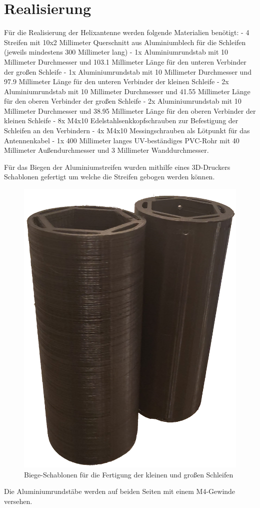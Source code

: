 \section{Realisierung}
Für die Realisierung der Helixantenne werden folgende Materialien benötigt:\newline
- 4 Streifen mit 10x2 Millimeter Querschnitt aus Aluminiumblech für die Schleifen (jeweils mindestens 300 Millimeter lang)\newline
- 1x Aluminiumrundstab mit 10 Millimeter Durchmesser und 103.1 Millimeter Länge für den unteren Verbinder der großen Schleife\newline
- 1x Aluminiumrundstab mit 10 Millimeter Durchmesser und 97.9 Millimeter Länge für den unteren Verbinder der kleinen Schleife\newline
- 2x Aluminiumrundstab mit 10 Millimeter Durchmesser und 41.55 Millimeter Länge für den oberen Verbinder der großen Schleife\newline
- 2x Aluminiumrundstab mit 10 Millimeter Durchmesser und 38.95 Millimeter Länge für den oberen Verbinder der kleinen Schleife\newline
- 8x M4x10 Edelstahlsenkkopfschrauben zur Befestigung der Schleifen an den Verbindern\newline
- 4x M4x10 Messingschrauben als Lötpunkt für das Antennenkabel \newline
- 1x 400 Millimeter langes UV-beständiges PVC-Rohr mit 40 Millimeter Außendurchmesser und 3 Millimeter Wanddurchmesser.

Für das Biegen der Aluminiumstreifen wurden mithilfe eines 3D-Druckers Schablonen gefertigt um welche die Streifen gebogen werden können. 

\begin{figure} [H]
	\centering
	\includegraphics[width=.25\linewidth]{../ref/qfh_biegschablone.png}
	\caption{Biege-Schablonen für die Fertigung der kleinen und großen Schleifen}
	\label{fig:schablonen_qha}
\end{figure}

Die Aluminiumrundstäbe werden auf beiden Seiten mit einem M4-Gewinde versehen.

